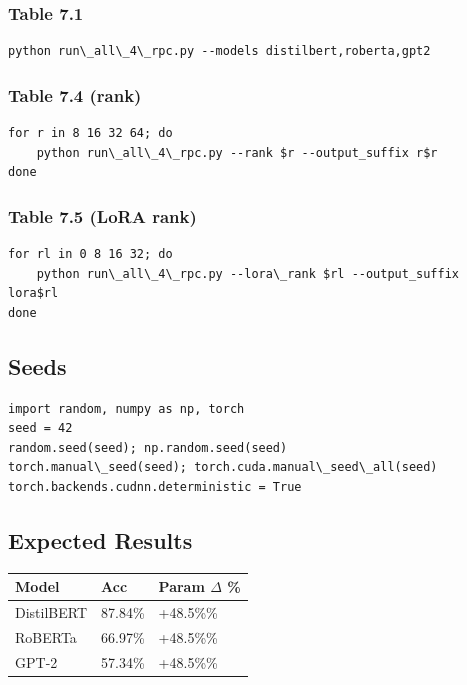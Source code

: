 \subsubsection{Table 7.1}
\begin{lstlisting}
python run\_all\_4\_rpc.py --models distilbert,roberta,gpt2
\end{lstlisting}

\subsubsection{Table 7.4 (rank)}
\begin{lstlisting}
for r in 8 16 32 64; do
    python run\_all\_4\_rpc.py --rank $r --output_suffix r$r
done
\end{lstlisting}

\subsubsection{Table 7.5 (LoRA rank)}
\begin{lstlisting}
for rl in 0 8 16 32; do
    python run\_all\_4\_rpc.py --lora\_rank $rl --output_suffix lora$rl
done
\end{lstlisting}

\subsection{Seeds}

\begin{lstlisting}
import random, numpy as np, torch
seed = 42
random.seed(seed); np.random.seed(seed)
torch.manual\_seed(seed); torch.cuda.manual\_seed\_all(seed)
torch.backends.cudnn.deterministic = True
\end{lstlisting}

\subsection{Expected Results}

\begin{table}[H]
\centering
\small
\begin{tabular}{lll}
\toprule
\textbf{Model} & \textbf{Acc} & \textbf{Param $\Delta$ \%} \\
\midrule
DistilBERT & 87.84\% & +48.5\%\% \\
RoBERTa & 66.97\% & +48.5\%\% \\
GPT-2 & 57.34\% & +48.5\%\% \\
\bottomrule
\end{tabular}
\end{table}

